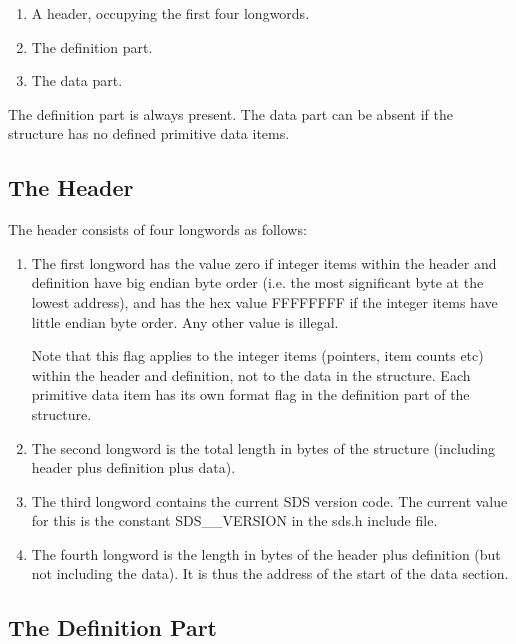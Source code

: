 \begin{enumerate}

\item A header, occupying the first four longwords.

\item The definition part.

\item The data part.

\end{enumerate}

The definition part is always present. The data part can be absent if the
structure has no defined primitive data items.

\subsection{The Header}

The header consists of four longwords as follows:

\begin{enumerate}

\item The first longword has the value zero if integer items within the
header and definition have big endian byte order (i.e. the most significant
byte at the lowest address), and has the hex value FFFFFFFF if the integer
items have little endian byte order. Any other value is illegal.

Note that this flag applies to the integer items (pointers, item counts etc)
within the header and definition, not to the data in the structure. Each
primitive data item has its own format flag in the definition part of the
structure.

\item The second longword is the total length in bytes of the structure
(including header plus definition plus data).

\item The third longword contains the  current SDS version code. The current
value for this is the constant SDS\_\_VERSION in the sds.h include file.

\item The fourth longword is the length in bytes of the header plus definition
(but not including the data). It is thus the address of the start of the data
section. 

\end{enumerate}

\subsection{The Definition Part}

